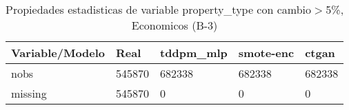 \begin{table}[H]
\centering
\fontsize{8}{14}\selectfont
\caption{Propiedades estadisticas de variable property\_type con cambio\ensuremath{>}5\%, Economicos (B-3)}
\label{table-stats-economicos-b-3-property_type-short}
\begin{tabular}{|l|m{10em}|m{10em}|m{10em}|m{10em}|}
\hline
 \rowcolor[gray]{0.8}
Variable/Modelo & Real & tddpm\_mlp & smote-enc & ctgan \\
\hline nobs & 545870 & 682338 & 682338 & 682338 \\
\hline missing & 545870 & 0 & 0 & 0 \\
\hline
\end{tabular}
\end{table}
